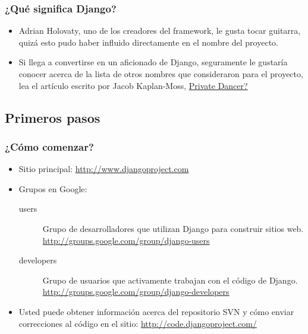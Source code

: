 \documentclass{beamer}
\begin{document}
\begin{frame}
  \frametitle{¿Qué significa Django?}
  \begin{itemize}[<+->]
    \item
      Adrian Holovaty, uno de los creadores del framework, le gusta tocar guitarra, quizá esto 
      pudo haber influido directamente en el nombre del proyecto.
    \item
      Si llega a convertirse en un aficionado de Django, seguramente le gustaría conocer acerca 
      de la lista de otros nombres que consideraron para el proyecto,
      lea el artículo escrito por Jacob Kaplan-Moss, 
      \href{http://www.jacobian.org/writing/2005/sep/09/private_dancer/}{Private
      Dancer?}
  \end{itemize}
\end{frame}

\subsection{Primeros pasos}
\begin{frame}
  \frametitle{¿Cómo comenzar?}
  \begin{itemize}[<+->]
    \item
      Sitio principal: \url{http://www.djangoproject.com}
    \item
      Grupos en Google:
      \begin{description}
        \item
	  [users] Grupo de desarrolladores que utilizan
	  \alert{Django} para construir sitios web.
	  \url{http://groups.google.com/group/django-users}
        \item
	  [developers] Grupo de usuarios que activamente trabajan con
	  el código de \alert{Django}.
	  \url{http://groups.google.com/group/django-developers}
      \end{description}
    \item
      Usted puede obtener información acerca del repositorio \alert{SVN}
      y cómo enviar correcciones al código en el sitio:
      \url{http://code.djangoproject.com/}
  \end{itemize}
\end{frame}
\end{document}
